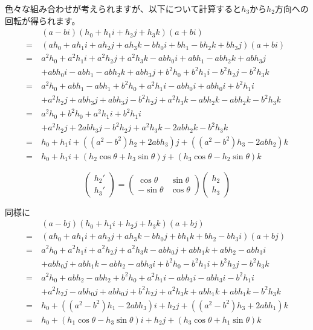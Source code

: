 \documentclass[a4paper,12pt,notitlepage]{jsreport}
\begin{document}
色々な組み合わせが考えられますが、以下について計算すると$h_3$から$h_2$方向への回転が得られます。
\begin{equation}
\begin{split}
&(a-bi)(h_0+h_1i+h_2j+h_3k)(a+bi)\\
=~&(ah_0+ah_1i+ah_2j+ah_3k-bh_0i+bh_1-bh_2k+bh_3j)(a+bi)\\
=~&a^2h_0+a^2h_1i+a^2h_2j+a^2h_3k-abh_0i+abh_1-abh_2k+abh_3j\\
&+abh_0i-abh_1-abh_2k+abh_3j+b^2h_0+b^2h_1i-b^2h_2j-b^2h_3k\\
=~&a^2h_0+abh_1-abh_1+b^2h_0+a^2h_1i-abh_0i+abh_0i+b^2h_1i\\
&+a^2h_2j+abh_3j+abh_3j-b^2h_2j+a^2h_3k-abh_2k-abh_2k-b^2h_3k\\
=~&a^2h_0+b^2h_0+a^2h_1i+b^2h_1i\\
&+a^2h_2j+2abh_3j-b^2h_2j+a^2h_3k-2abh_2k-b^2h_3k\\
=~&h_0+h_1i+((a^2-b^2)h_2+2abh_3)j+((a^2-b^2)h_3-2abh_2)k\\
=~&h_0+h_1i+(h_2\cos\theta+h_3\sin\theta)j+(h_3\cos\theta-h_2\sin\theta)k
\end{split}
\end{equation}

\begin{equation}
\begin{pmatrix}h_2'\\h_3'\end{pmatrix}
=\begin{pmatrix}\cos\theta&\sin\theta\\-\sin\theta&\cos\theta\end{pmatrix}
\begin{pmatrix}h_2\\h_3\end{pmatrix}
\end{equation}

同様に
\begin{equation}
\begin{split}
&(a-bj)(h_0+h_1i+h_2j+h_3k)(a+bj)\\
=~&(ah_0+ah_1i+ah_2j+ah_3k-bh_0j+bh_1k+bh_2-bh_3i)(a+bj)\\
=~&a^2h_0+a^2h_1i+a^2h_2j+a^2h_3k-abh_0j+abh_1k+abh_2-abh_3i\\
&+abh_0j+abh_1k-abh_2-abh_3i+b^2h_0-b^2h_1i+b^2h_2j-b^2h_3k\\
=~&a^2h_0+abh_2-abh_2+b^2h_0+a^2h_1i-abh_3i-abh_3i-b^2h_1i\\
&+a^2h_2j-abh_0j+abh_0j+b^2h_2j+a^2h_3k+abh_1k+abh_1k-b^2h_3k\\
=~&h_0+((a^2-b^2)h_1-2abh_3)i+h_2j+((a^2-b^2)h_3+2abh_1)k\\
=~&h_0+(h_1\cos\theta-h_3\sin\theta)i+h_2j+(h_3\cos\theta+h_1\sin\theta)k\\
\end{split}
\end{equation}
\end{document}
